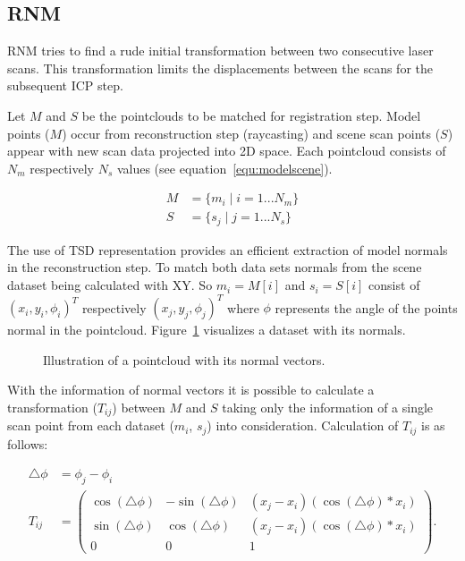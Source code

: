 \documentclass[conference]{IEEEtran}
\begin{document}
\subsection{RNM}
RNM tries to find a rude initial transformation between two consecutive laser scans. This transformation limits the displacements between the scans for the subsequent ICP step.

Let $M$ and $S$ be the pointclouds to be matched for registration step. Model points ($M$) occur from reconstruction step (raycasting) and scene scan points ($S$) appear with new scan data projected into 2D space. Each pointcloud consists of $N_m$ respectively $N_s$ values (see equation~\ref{equ:modelscene}).

\begin{align}
\label{equ:modelscene}
M &= \{m_i \mid i = 1...N_m\} \\
S &= \{s_j \mid j = 1...N_s\} \nonumber
\end{align}

The use of TSD representation provides an efficient extraction of model normals in the reconstruction step. To match both data sets normals from the scene dataset being calculated with XY. So $m_i=M[i]$ and $s_i=S[i]$ consist of $(x_i, y_i, \phi_i)^T$ respectively $(x_j, y_j, \phi_j)^T$ where $\phi$ represents the angle of the points normal in the pointcloud. Figure~\ref{fig:pointcloud} visualizes a dataset with its normals.

\begin{figure}[h] 
	\centering 
	\caption{Illustration of a pointcloud with its normal vectors.} 
	\label{fig:pointcloud}
\end{figure}

With the information of normal vectors it is possible to calculate a transformation ($T_{ij}$) between $M$ and $S$ taking only the information of a single scan point from each dataset ($m_i$, $s_j$) into consideration. Calculation of $T_{ij}$ is as follows:

\begin{align}
\label{equ:tij}
\bigtriangleup \phi &= \phi_j - \phi_i \\
T_{ij} &=
\begin{pmatrix}
\cos(\bigtriangleup \phi) & -\sin(\bigtriangleup \phi) & (x_j - x_i)(\cos(\bigtriangleup \phi) * x_i)\\
\sin(\bigtriangleup \phi) &  \cos(\bigtriangleup \phi) & (x_j - x_i)(\cos(\bigtriangleup \phi) * x_i)\\
0 & 0 & 1
\end{pmatrix}.
\nonumber
\end{align}
\end{document}
